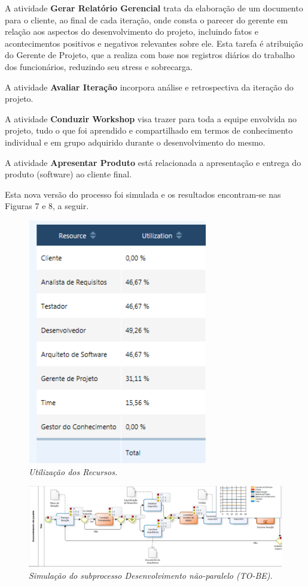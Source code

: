 A atividade \textbf{Gerar Relatório Gerencial} trata da elaboração de um documento para o cliente, ao final de cada iteração, onde consta o parecer do gerente em relação aos aspectos do desenvolvimento do projeto, incluindo fatos e acontecimentos positivos e negativos relevantes sobre ele. Esta tarefa é atribuição do Gerente de Projeto, que a realiza com base nos registros diários do trabalho dos funcionários, reduzindo seu stress e sobrecarga. 

A atividade \textbf{Avaliar Iteração} incorpora análise e retrospectiva da iteração do projeto. 

A atividade \textbf{Conduzir Workshop} visa trazer para toda a equipe envolvida no projeto, tudo o que foi aprendido e compartilhado em termos de conhecimento individual e em grupo adquirido durante o desenvolvimento do mesmo.

A atividade \textbf{Apresentar Produto} está relacionada a apresentação e entrega do produto (software) ao cliente final. 

Esta nova versão do processo foi simulada e os resultados encontram-se nas Figuras 7 e 8, a seguir.

\begin{figure}[H]
\centering\includegraphics[scale=0.5]{figuras/utilizacaoRecursos.png}
\caption{\textit{Utilização dos Recursos.}}
\end{figure}

\begin{figure}[H]
\centering\includegraphics[scale=0.5]{figuras/simulacaoSubProcessoDevNaoParalelo.png}
\caption{\textit{Simulação do subprocesso Desenvolvimento não-paralelo (TO-BE).}}
\end{figure}

